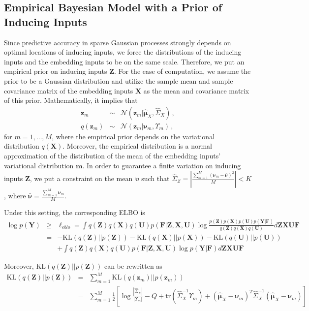 \documentclass{article}
\begin{document}
\subsection{Empirical Bayesian Model with a Prior of Inducing Inputs}
Since predictive accuracy in sparse Gaussian processes strongly depends on optimal locations of inducing inputs, we force the distributions of the inducing inputs and the embedding inputs to be on the same scale. Therefore, we put an empirical prior on inducing inputs $\bm Z$. For the ease of computation, we assume the prior to be a Gaussian distribution and utilize the sample mean and sample covariance matrix of the embedding inputs $\bm X$ as the mean and covariance matrix of this prior. Mathematically, it implies that
\begin{eqnarray}
\bm z_{m} & \sim & \mathcal{N}(\bm z_{m} | \hat{\bm \mu}_X, \hat{\Sigma}_X) \,, \\
q(\bm z_{m}) & \sim & \mathcal{N}(\bm z_{m} | \bm \nu_{m}, \Upsilon_{m})\,,
\end{eqnarray}
for $m = 1, \ldots, M$, where the empirical prior depends on the variational distribution $q(\bm X)$. Moreover, the empirical distribution is a normal approximation of the distribution of the mean of the embedding inputs' variational distribution $\bm m$. In order to guarantee a finite variation on inducing inputs $\bm Z$, we put a constraint on the mean $\bm \upsilon$ such that $\hat{\Sigma}_{Z} = |\frac{\sum_{m = 1}^{M}(\bm \nu_m - \bar{\bm \nu})^2}{M}| < K$, where $\bar{\bm \nu} = \frac{\sum_{m = 1}^{M}\bm \nu_m}{M}$.

Under this setting, the corresponding ELBO is 
{\footnotesize
	\begin{eqnarray}
	\log p(\bm Y) & \geq & \ell_{eblo} = \int q(\bm Z)q(\bm X)q(\bm U)p(\bm F|\bm Z, \bm X, \bm U) \log\frac{p(\bm Z)p(\bm X)p(\bm U)p(\bm Y| \bm F)}{q(\bm Z)q(\bm X)q(\bm U)}d\bm Z\bm X\bm U\bm F \nonumber \\
	& = &  -\mathrm{KL}(q(\bm Z)|| p(\bm Z)) - \mathrm{KL}(q(\bm X)|| p(\bm X)) - \mathrm{KL}(q(\bm U) ||p(\bm U )) \nonumber \\
	& &+ \int q(\bm Z)q(\bm X) q(\bm U)p(\bm F|\bm Z, \bm X, \bm U)\log p(\bm Y|\bm F) d\bm Z\bm X\bm U\bm F \nonumber
	\end{eqnarray}
}

Moreover, $\mathrm{KL}(q(\bm Z)|| p(\bm Z))$ can be rewritten as 
{\footnotesize
	\begin{eqnarray}
	\mathrm{KL}(q(\bm Z)||p(\bm Z)) & = & \sum_{m = 1}^{M} \mathrm{KL}(q(\bm z_m)||p(\bm z_m)) \nonumber \\
	& = &\sum_{m = 1}^{M}\frac{1}{2}\left[\log\frac{|\hat{\Sigma}_X|}{|\Upsilon_m|} - Q + \mathrm{tr}(\hat{\Sigma}_X^{-1}\Upsilon_m) + (\hat{\bm\mu}_X - \bm \nu_m)^T\hat{\Sigma}_X^{-1}(\hat{\bm\mu}_X - \bm \nu_m)\right] \nonumber\\
	& &
	\label{KL_Z}
	\end{eqnarray}
}
\end{document}
